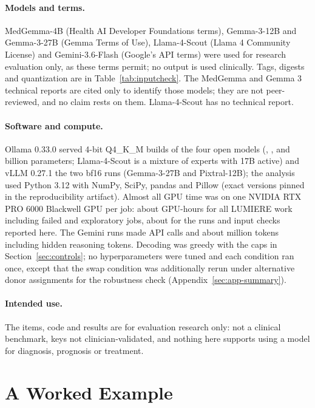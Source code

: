 \documentclass[11pt]{article}
\begin{document}
\paragraph{Models and terms.} MedGemma-4B (Health AI Developer Foundations terms), Gemma-3-12B and Gemma-3-27B (Gemma Terms of Use), Llama-4-Scout (Llama 4 Community License) and Gemini-3.6-Flash (Google's API terms) were used for research evaluation only, as these terms permit; no output is used clinically. Tags, digests and quantization are in Table~\ref{tab:inputcheck}. The MedGemma and Gemma 3 technical reports are cited only to identify those models; they are not peer-reviewed, and no claim rests on them. Llama-4-Scout has no technical report.

\paragraph{Software and compute.} Ollama 0.33.0 served 4-bit Q4\_K\_M builds of the four open models (\vfourParamsMedGemma{}, \vfourParamsGemmaTwelve{}, \vfourParamsGemmaTwentySeven{} and \vfourParamsScout{} billion parameters; Llama-4-Scout is a mixture of experts with 17B active) and vLLM 0.27.1 the two bf16 runs (Gemma-3-27B and Pixtral-12B); the analysis used Python 3.12 with NumPy, SciPy, pandas and Pillow (exact versions pinned in the reproducibility artifact). Almost all GPU time was on one NVIDIA RTX PRO 6000 Blackwell GPU per job: about \vfourGpuHoursAll{} GPU-hours for all LUMIERE work including failed and exploratory jobs, about \vfourGpuHoursVfour{} for the runs and input checks reported here. The Gemini runs made \vfourApiCalls{} API calls and about \vfourApiTokensM{} million tokens including hidden reasoning tokens. Decoding was greedy with the caps in Section~\ref{sec:controls}; no hyperparameters were tuned and each condition ran once, except that the swap condition was additionally rerun under \vfourRobustGeminiNAssign{} alternative donor assignments for the robustness check (Appendix~\ref{sec:app-summary}).

\paragraph{Intended use.} The items, code and results are for evaluation research only: not a clinical benchmark, keys not clinician-validated, and nothing here supports using a model for diagnosis, prognosis or treatment.


\section{A Worked Example}
\label{sec:worked-v4}
\end{document}
